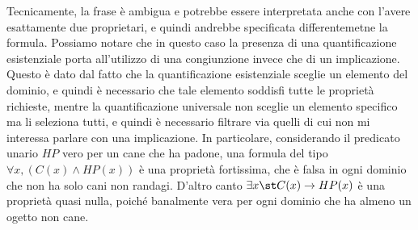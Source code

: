 Tecnicamente, la frase è ambigua e potrebbe essere interpretata anche con l'avere esattamente due proprietari, e quindi andrebbe specificata differentemetne la formula. Possiamo notare che in questo caso la presenza di una quantificazione esistenziale porta all'utilizzo di una congiunzione invece che di un implicazione. Questo è dato dal fatto che la quantificazione esistenziale sceglie un elemento del dominio, e quindi è necessario che tale elemento soddisfi tutte le proprietà richieste, mentre la quantificazione universale non sceglie un elemento specifico ma li seleziona tutti, e quindi è necessario filtrare via quelli di cui non mi interessa parlare con una implicazione. In particolare, considerando il predicato unario \(HP\) vero per un cane che ha padone, una formula del tipo \(\forall x, (C(x) \land HP(x))\) è una proprietà fortissima, che è falsa in ogni dominio che non ha solo cani non randagi. D'altro canto \(\exists x\st C(x) \to HP(x)\) è una proprietà quasi nulla, poiché banalmente vera per ogni dominio che ha almeno un ogetto non cane.